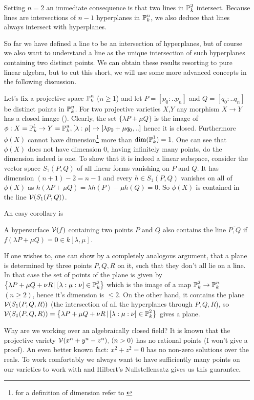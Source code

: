 \begin{corollary} \label{corollarySimpleIntersect}
Setting $n=2$ an immediate consequence is that two lines in $\operatorname{\mathbb P}^2_k$ intersect.
Because lines are intersections of $n-1$ hyperplanes in $\operatorname{\mathbb P}^n_k$, we also deduce that lines always intersect with hyperplanes.
\end{corollary}

So far we have defined a line to be an intersection of hyperplanes, but of course we also want to understand a line as the unique intersection of such hyperplanes containing two distinct points.
We can obtain these results resorting to pure linear algebra, but to cut this short, we will use some more advanced concepts in the following discussion.

Let's fix a projective space $\operatorname{\mathbb P}^n_k$ ($n\geq 1$) and let $P=[p_0:..p_n]$ and $Q=[q_0:..q_n]$ be distinct points in $\operatorname{\mathbb P}^n_k$.
For two projective varieties $X$,$Y$ any morphism $X \to Y$ has a closed image (\cite[theorem 1.10]{shafarevich1994basic}).
Clearly, the set $\{ \lambda P + \mu Q \}$ is the image of $\phi : X=\operatorname{\mathbb P}^1_k \to Y=\operatorname{\mathbb P}^n_k, [\lambda:\mu] \mapsto [\lambda p_0 + \mu q_0,..]$ hence it is closed.
Furthermore $\phi(X)$ cannot have dimension\footnote{for a definition of dimension refer to \cite[chapter 6]{shafarevich1994basic}} more than $\dim(\operatorname{\mathbb P}^1_k) = 1$.
One can see that $\phi(X)$ does not have dimension 0, having infinitely many points, do the dimension indeed is one.
To show that it is indeed a linear subspace, consider the vector space $S_1(P,Q)$ of all linear forms vanishing on $P$ and $Q$.
It has dimension $(n+1) - 2 = n-1$ and every $h \in S_1(P,Q)$ vanishes on all of $\phi(X)$ as $h(\lambda P + \mu Q) = \lambda h(P) + \mu h(Q) = 0$.
So $\phi(X)$ is contained in the line $\operatorname{\mathcal V}(S_1(P,Q))$.

An easy corollary is
\begin{lemma} \label{lemmaLineOnSurface}
A hypersurface $\operatorname{\mathcal V}(f)$ containing two points $P$ and $Q$ also contains the line $\overline{P,Q}$ if $f(\lambda P +\mu Q) = 0 \in k[\lambda,\mu]$.
\end{lemma}

If one wishes to, one can show by a completely analogous argument, that a plane is determined by three points $P,Q,R$ on it, such that they don't all lie on a line.
In that case the set of points of the plane is given by $\left\lbrace\lambda P + \mu Q + \nu R\,|\, [\lambda:\mu:\nu] \in \operatorname{\mathbb P}^2_k\right\rbrace$ which is the image of a map $\operatorname{\mathbb P}^2_k \to \operatorname{\mathbb P}^n_k$ $(n\geq 2)$, hence it's dimension is $\leq 2$.
On the other hand, it contains the plane $\operatorname{\mathcal V}(S_1(P,Q,R))$ (the intersection of all the hyperplanes through $P,Q,R$), so $\operatorname{\mathcal V}(S_1(P,Q,R)) = \left\lbrace\lambda P + \mu Q + \nu R\,|\, [\lambda:\mu:\nu] \in \operatorname{\mathbb P}^2_k\right\rbrace$ gives a plane.

\begin{remark}
Why are we working over an algebraically closed field?
It is known that the projective variety $\operatorname{\mathcal V}(x^n + y^n - z^n), \,(n>0)$ has no rational points (I won't give a proof).
An even better known fact: $x^2 + z^2 = 0$ has no non-zero solutions over the reals.
To work comfortably we always want to have sufficiently many points on our varieties to work with and Hilbert's Nullstellensatz gives us this guarantee.
\end{remark}
